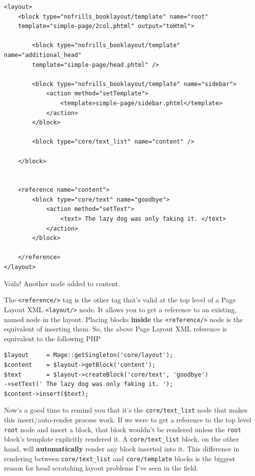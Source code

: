 \documentclass[oneside]{book}
\begin{document}
\begin{lstlisting}
<layout>
    <block type="nofrills_booklayout/template" name="root"
    template="simple-page/2col.phtml" output="toHtml">

        <block type="nofrills_booklayout/template" name="additional_head"
        template="simple-page/head.phtml" />

        <block type="nofrills_booklayout/template" name="sidebar">
            <action method="setTemplate">
                <template>simple-page/sidebar.phtml</template>
            </action>
        </block>

        <block type="core/text_list" name="content" />

    </block>


    <reference name="content">
        <block type="core/text" name="goodbye">
            <action method="setText">
                <text> The lazy dog was only faking it. </text>
            </action>
        </block>

    </reference>    
</layout>

\end{lstlisting}


Voila!  Another node added to content.

The \footnotesize\texttt{\textless reference/\textgreater } \normalsize  tag is the other tag that's valid at the top level of a Page Layout XML \footnotesize\texttt{\textless layout/\textgreater } \normalsize  node.  It allows you to get a reference to an existing, named node in the layout.  Placing blocks \textbf{inside} the \footnotesize\texttt{\textless reference/\textgreater } \normalsize  node is the equivalent of inserting them. So, the above Page Layout XML reference is equivalent to the following PHP

\begin{lstlisting}
$layout     = Mage::getSingleton('core/layout');
$content    = $layout->getBlock('content');
$text       = $layout->createBlock('core/text', 'goodbye')
->setText(' The lazy dog was only faking it. ');
$content->insert($text);

\end{lstlisting}


Now's a good time to remind you that it's the \footnotesize\texttt{core/text\_list} \normalsize  node that makes this insert/auto-render process work.  If we were to get a reference to the top level \footnotesize\texttt{root} \normalsize  node and insert a block, that block wouldn't be rendered unless the \footnotesize\texttt{root} \normalsize  block's template explicitly rendered it.  A \footnotesize\texttt{core/text\_list} \normalsize  block, on the other hand, will \textbf{automatically} render any block inserted into it.  This difference in rendering between \footnotesize\texttt{core/text\_list} \normalsize  and \footnotesize\texttt{core/template} \normalsize  blocks is the biggest reason for head scratching layout problems I've seen in the field. 
\end{document}
